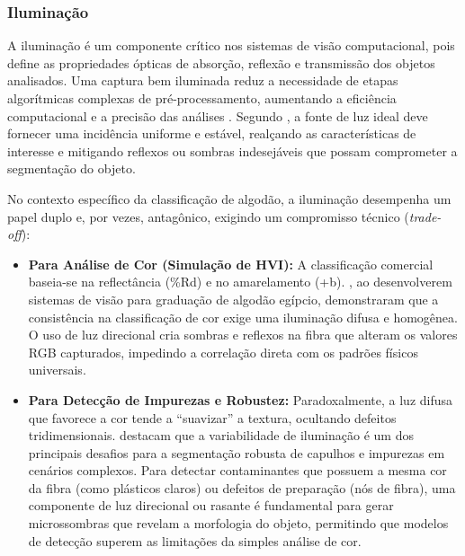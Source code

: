     \subsubsection{Iluminação}

        A iluminação é um componente crítico nos sistemas de visão computacional, pois define as propriedades ópticas de absorção, reflexão e transmissão dos objetos analisados. Uma captura bem iluminada reduz a necessidade de etapas algorítmicas complexas de pré-processamento, aumentando a eficiência computacional e a precisão das análises \cite{chen2002machine_vision}. Segundo , a fonte de luz ideal deve fornecer uma incidência uniforme e estável, realçando as características de interesse e mitigando reflexos ou sombras indesejáveis que possam comprometer a segmentação do objeto.

        No contexto específico da classificação de algodão, a iluminação desempenha um papel duplo e, por vezes, antagônico, exigindo um compromisso técnico (\textit{trade-off}):

        \begin{itemize}
            \item \textbf{Para Análise de Cor (Simulação de HVI):} A classificação comercial baseia-se na reflectância (\%Rd) e no amarelamento (+b). , ao desenvolverem sistemas de visão para graduação de algodão egípcio, demonstraram que a consistência na classificação de cor exige uma iluminação difusa e homogênea. O uso de luz direcional cria sombras e reflexos na fibra que alteram os valores RGB capturados, impedindo a correlação direta com os padrões físicos universais.
            
            \item \textbf{Para Detecção de Impurezas e Robustez:} Paradoxalmente, a luz difusa que favorece a cor tende a ``suavizar'' a textura, ocultando defeitos tridimensionais.  destacam que a variabilidade de iluminação é um dos principais desafios para a segmentação robusta de capulhos e impurezas em cenários complexos. Para detectar contaminantes que possuem a mesma cor da fibra (como plásticos claros) ou defeitos de preparação (nós de fibra), uma componente de luz direcional ou rasante é fundamental para gerar microssombras que revelam a morfologia do objeto, permitindo que modelos de detecção superem as limitações da simples análise de cor.
        \end{itemize}

